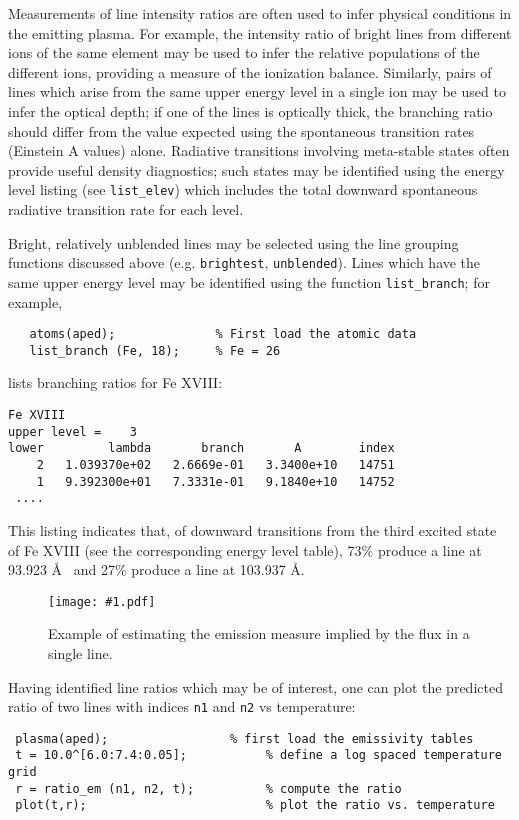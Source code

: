 \documentclass{book}
\newcommand{\putfig}[1]{\texttt{[image: \#1.pdf]}}
\newcommand{\putfig}[1]{\psfig{file=#1.ps}}
\begin{document}
Measurements of line intensity ratios are often used to infer physical
conditions in the emitting plasma.  For example, the intensity ratio of
bright lines from different ions of the same element may be used to infer
the relative populations of the different ions, providing a measure of the
ionization balance.  Similarly, pairs of lines which arise from the same
upper energy level in a single ion may be used to infer the optical depth;
if one of the lines is optically thick, the branching ratio should differ
from the value expected using the spontaneous transition rates (Einstein A
values) alone.  Radiative transitions involving meta-stable states often
provide useful density diagnostics; such states may be identified using
the energy level listing (see {\tt list\_elev}) which includes the total
downward spontaneous radiative transition rate for each level.

Bright, relatively unblended lines may be selected using the line grouping
functions discussed above (e.g. {\tt brightest}, {\tt unblended}).  Lines
which have the same upper energy level may be identified
using the function {\tt list\_branch}; for example,
\begin{verbatim}
   atoms(aped);              % First load the atomic data
   list_branch (Fe, 18);     % Fe = 26
\end{verbatim}
lists branching ratios for Fe XVIII:
\begin{verbatim}
Fe XVIII
upper level =    3
lower         lambda       branch       A        index
    2   1.039370e+02   2.6669e-01   3.3400e+10   14751
    1   9.392300e+01   7.3331e-01   9.1840e+10   14752
 ....
\end{verbatim}
This listing indicates that, of downward transitions from the third
excited state of Fe XVIII (see the corresponding energy level table),
73\% produce a line at 93.923 \AA~ and 27\% produce a line at 103.937 \AA.

\begin{figure}[ht]
\putfig{figures/crude_dem}
\caption{Example of estimating the emission measure implied by the flux in a
single line.}
\label{fig:crude_dem}
\end{figure}

Having identified line ratios which may be of interest, one can plot the
predicted ratio of two lines with indices {\tt n1} and {\tt n2} vs
temperature:

 \begin{verbatim}
 plasma(aped);                 % first load the emissivity tables
 t = 10.0^[6.0:7.4:0.05];           % define a log spaced temperature grid
 r = ratio_em (n1, n2, t);          % compute the ratio
 plot(t,r);                         % plot the ratio vs. temperature
 \end{verbatim}
\end{document}
